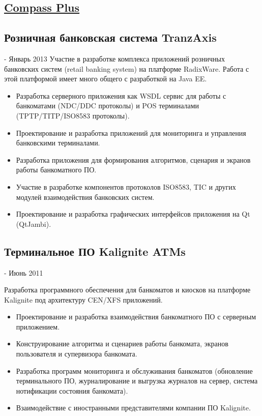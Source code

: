 \documentclass{article}
\begin{document}
\subsection*{\href{https://www.compassplus.ru/}{Compass Plus}}

\subsection*{Розничная банковская система TranzAxis}
 - Январь 2013
\normalsize
Участие в разработке комплекса приложений розничных банковских систем (retail banking system) на платформе RadixWare. Работа с этой платформой имеет много общего с разработкой на Java EE. 
\begin{itemize}
  \item Разработка серверного приложения как WSDL сервис для работы с банкоматами (NDC/DDC протоколы) и POS терминалами (TPTP/TITP/ISO8583 протоколы).
  \item Проектирование и разработка приложений для мониторинга и управления банковскими терминалами.
  \item Разработка приложения для формирования алгоритмов, сценария и экранов работы банкоматного ПО.
  \item Участие в разработке компонентов протоколов ISO8583, TIC и других модулей взаимодействия банковских систем.
  \item Проектирование и разработка графических интерфейсов приложения на Qt (QtJambi).
\end{itemize}

\subsection*{Терминальное ПО Kalignite ATMs}
 - Июнь 2011
\normalsize

Разработка программного обеспечения для банкоматов и киосков на платформе Kalignite под архитектуру CEN/XFS приложений.
\begin{itemize}
  \item Проектирование и разработка взаимодействия банкоматного ПО с серверным приложением.
  \item Конструирование алгоритма и сценариев работы банкомата, экранов пользователя и супервизора банкомата.
  \item Разработка программ мониторинга и обслуживания банкоматов (обновление терминального ПО, журналирование и выгрузка журналов на сервер, система нотификации состояния банкомата).
  \item Взаимодействие с иностранными представителями компании ПО Kalignite.
\end{itemize}
\end{document}
